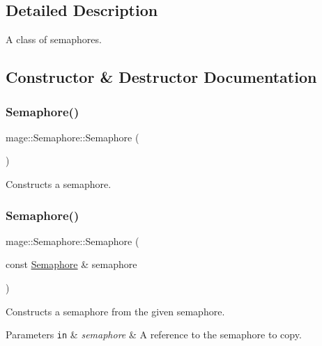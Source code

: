 \subsection{Detailed Description}
A class of semaphores. 

\subsection{Constructor \& Destructor Documentation}
\hypertarget{classmage_1_1_semaphore_a3733a67071b832a57ec086d52b28fd84}{}\label{classmage_1_1_semaphore_a3733a67071b832a57ec086d52b28fd84} 
\subsubsection{\texorpdfstring{Semaphore()}{Semaphore()}\hspace{0.1cm}{\footnotesize\ttfamily [1/3]}}
{\footnotesize\ttfamily mage\+::\+Semaphore\+::\+Semaphore (\begin{DoxyParamCaption}{ }\end{DoxyParamCaption})\hspace{0.3cm}{\ttfamily [noexcept]}}

Constructs a semaphore. \hypertarget{classmage_1_1_semaphore_a8873b2ed82ff66d323a8c3cebf0fb5c0}{}\label{classmage_1_1_semaphore_a8873b2ed82ff66d323a8c3cebf0fb5c0} 
\subsubsection{\texorpdfstring{Semaphore()}{Semaphore()}\hspace{0.1cm}{\footnotesize\ttfamily [2/3]}}
{\footnotesize\ttfamily mage\+::\+Semaphore\+::\+Semaphore (\begin{DoxyParamCaption}\item[{const \hyperlink{classmage_1_1_semaphore}{Semaphore} \&}]{semaphore }\end{DoxyParamCaption})\hspace{0.3cm}{\ttfamily [delete]}}

Constructs a semaphore from the given semaphore.


\begin{DoxyParams}[1]{Parameters}
\mbox{\tt in}  & {\em semaphore} & A reference to the semaphore to copy. \\
\hline
\end{DoxyParams}
\hypertarget{classmage_1_1_semaphore_abe3e33b06c3cb3cbfe3fa041ef80434f}{}\label{classmage_1_1_semaphore_abe3e33b06c3cb3cbfe3fa041ef80434f} 
